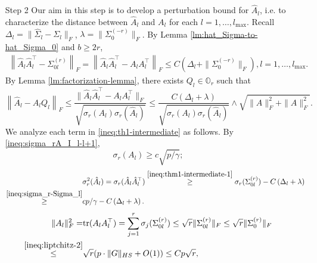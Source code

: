 \documentclass[11pt]{article}
\newcommand{\0}{{\mathbf{0}}}
\newcommand{\1}{{\mathbf{1}}}
\newcommand{\tr}{{\rm tr}}
\begin{document}
\begin{enumerate}[leftmargin=*]
	
	\item[Step 2] Our aim in this step is to develop a perturbation bound for $\hat{A}_l$, i.e. to characterize the distance between $\hat{A}_l$ and $A_l$ for each $l=1,\ldots, l_{\max}$. Recall $\Delta_l = \|\hat{\Sigma}_l - \Sigma_l\|_F$, $\lambda = \|\Sigma_0^{(-r)}\|_F$. By Lemma \ref{lm:hat_Sigma-to-hat_Sigma_0} and $b \geq 2r$,
	\begin{equation}\label{ineq:thm1-intermediate-1}
	\begin{split}
	\left\|\hat{A}_l\hat{A}_l^\top - \Sigma_{0l}^{(r)}\right\|_F = \left\|\hat{A}_l\hat{A}_l^\top - A_lA_l^\top \right\|_F \leq C\left(\Delta_l + \|\Sigma_{0}^{(-r)}\|_F\right), l=1,\ldots, l_{\max}.
	\end{split}
	\end{equation}
	By Lemma \ref{lm:factorization-lemma}, there exists $Q_l \in \mathbb{O}_{r}$ such that
	\begin{equation}\label{ineq:th1-intermediate}
	\left\|\hat{A}_l - A_lQ_l \right\|_F \leq \frac{\|\hat{A}_l\hat{A}_l^\top - A_lA_l^\top\|_F}{\sqrt{\sigma_r(A_l)\sigma_r(\hat{A}_l)}} \leq \frac{C\left(\Delta_l + \lambda\right)}{\sqrt{\sigma_r(A_l)\sigma_r(\hat{A}_l)}} \wedge \sqrt{\|\hat{A}\|_F^2 + \|A\|_F^2}.
	\end{equation}
	We analyze each term in \eqref{ineq:th1-intermediate} as follows. By \eqref{ineq:sigma_rA_I_l-l+1}, 
	$$\sigma_r(A_l) \geq c\sqrt{p/\gamma};$$
	\begin{equation}\label{ineq:sigma-r-hat-A-l}
	\begin{split}
	& \sigma_r^2(\hat{A}_l) = \sigma_r(\hat{A}_l\hat{A}_l^\top) \overset{\eqref{ineq:thm1-intermediate-1}}{\geq} \sigma_r(\Sigma_{0l}^{(r)}) - C\left(\Delta_l + \lambda\right)\\
	\overset{\eqref{ineq:sigma_r-Sigma_l}}{\geq} & cp/\gamma - C\left(\Delta_l +\lambda\right).
	\end{split}
	\end{equation}
	\begin{equation*}
	\begin{split}
	\|A_l\|_F^2 = & \tr(A_lA_l^\top) = \sum_{j=1}^r \sigma_j(\Sigma_{0l}^{(r)}) \leq \sqrt{r} \|\Sigma_{0l}^{(r)}\|_F \leq \sqrt{r}\|\Sigma_0^{(r)}\|_F\\
	\overset{\eqref{ineq:liptchitz-2}}{\leq} & \sqrt{r} (p\cdot \|G\|_{HS} + O(1)) \leq Cp\sqrt{r},
	\end{split}
	\end{equation*}
	\begin{equation*}
	\begin{split}

\end{split}
\end{equation*}
\end{enumerate}
\end{document}
